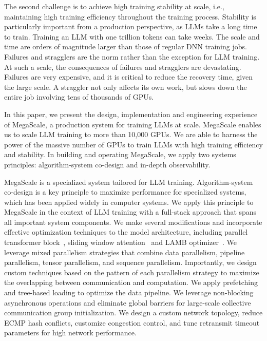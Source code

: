 \documentclass[letterpaper,twocolumn,10pt]{article}
\newcommand{\sysname}{MegaScale\xspace}
\newcommand{\revision}[1]{{#1}}
\begin{document}
The second challenge is to achieve high training stability at scale, i.e.,
maintaining high training efficiency throughout the training process. Stability
is particularly important from a production perspective, as LLMs take a long
time to train. Training an LLM with one trillion tokens can take weeks. The
scale and time are orders of magnitude larger than those of regular DNN training
jobs. Failures and stragglers are the norm rather than the exception for LLM
training. At such a scale, the consequences of failures and stragglers are
devastating. Failures are very expensive, and it is critical to reduce the
recovery time, given the large scale. A straggler not only affects its own work,
but slows down the entire job involving tens of thousands of GPUs. 

In this paper, we present the design, implementation and engineering experience
of \sysname, a production system for training LLMs at scale. \sysname enables us
to scale LLM training to more than 10,000 GPUs. We are able to harness the power
of the massive number of GPUs to train LLMs with high training efficiency and
stability. In building and operating \sysname, we apply two systems principles:
algorithm-system co-design and \revision{in-depth observability}. 

\sysname is a specialized system tailored for LLM training. Algorithm-system
co-design is a key principle to maximize performance for specialized systems,
which has been applied widely in computer systems. We apply this
principle to \sysname in the context of LLM training with a full-stack approach
that spans all important system components. We make several modifications and
incorporate effective optimization techniques to the model architecture,
including parallel transformer block~\cite{chowdhery2022palm},
sliding window attention~\cite{beltagy2020longformer} and LAMB optimizer~\cite{You2020Large}. We leverage mixed parallelism strategies that combine data parallelism, pipeline parallelism, tensor
parallelism, and sequence parallelism. Importantly, we design custom techniques based
on the pattern of each parallelism strategy to maximize the overlapping between
communication and computation. We apply prefetching and
tree-based loading to optimize the data pipeline. We leverage non-blocking
asynchronous operations and eliminate global barriers for large-scale collective
communication group initialization. We design a custom network topology, reduce
ECMP hash conflicts, customize congestion control, and tune retransmit timeout
parameters for high network performance.
\end{document}

